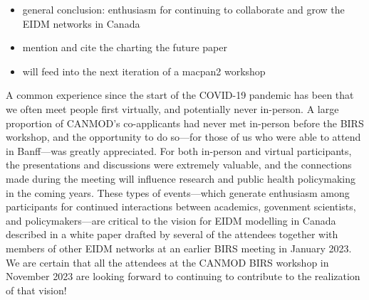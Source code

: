 \begin{itemize}
    \item general conclusion: enthusiasm for continuing to collaborate and grow the EIDM networks in Canada
    \item mention and cite the charting the future paper
    \item will feed into the next iteration of a macpan2 workshop
\end{itemize}

A common experience since the start of the COVID-19 pandemic has been
that we often meet people first virtually, and potentially never
in-person.  A large proportion of CANMOD's co-applicants had never met
in-person before the BIRS workshop, and the opportunity to do so---for
those of us who were able to attend in Banff---was greatly
appreciated.  For both in-person and virtual participants, the
presentations and discussions were extremely valuable, and the
connections made during the meeting will influence research and public
health policymaking in the coming years.  These types of
events---which generate enthusiasm among participants for continued
interactions between academics, govenment scientists, and
policymakers---are critical to the vision for EIDM modelling in Canada
described in a white paper \cite{Lewi+23} drafted by several of the
attendees together with members of other EIDM networks at an earlier
BIRS meeting in January 2023.  We are certain that all the attendees
at the CANMOD BIRS workshop in November 2023 are looking forward to
continuing to contribute to the realization of that vision!

